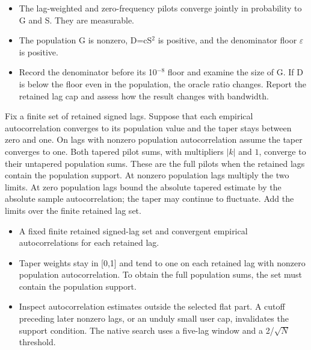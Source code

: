 \expandafter\def\csname statadic@assumptions@STATADIC-BLOCKLENGTH-003\endcsname{\begin{itemize}
\item The lag-weighted and zero-frequency pilots converge jointly in probability to G and S. They are measurable.
\item The population G is nonzero, D=cS\ensuremath{{}^2} is positive, and the denominator floor \ensuremath{\varepsilon} is positive.
\end{itemize}}
\expandafter\def\csname statadic@diagnostics@STATADIC-BLOCKLENGTH-003\endcsname{\begin{itemize}
\item Record the denominator before its 10\ensuremath{{}^{-8}} floor and examine the size of G. If D is below the floor even in the population, the oracle ratio changes. Report the retained lag cap and assess how the result changes with bandwidth.
\end{itemize}}
\expandafter\def\csname statadic@statement@STATADIC-BLOCKLENGTH-004\endcsname{Fix a finite set of retained signed lags. Suppose that
  each empirical autocorrelation converges to its population value and the
  taper stays between zero and one. On lags with nonzero population
  autocorrelation assume the taper converges to one. Both tapered pilot sums,
  with multipliers $|k|$ and $1$, converge to their untapered population
  sums. These are the full pilots when the retained lags contain the
  population support.}
\expandafter\def\csname statadic@proof@STATADIC-BLOCKLENGTH-004\endcsname{At nonzero population lags multiply the two limits.
  At zero population lags bound the absolute tapered estimate by the
  absolute sample autocorrelation; the taper may continue to fluctuate.
  Add the limits over the finite retained lag set.}
\expandafter\def\csname statadic@assumptions@STATADIC-BLOCKLENGTH-004\endcsname{\begin{itemize}
\item A fixed finite retained signed-lag set and convergent empirical autocorrelations for each retained lag.
\item Taper weights stay in [0,1] and tend to one on each retained lag with nonzero population autocorrelation. To obtain the full population sums, the set must contain the population support.
\end{itemize}}
\expandafter\def\csname statadic@diagnostics@STATADIC-BLOCKLENGTH-004\endcsname{\begin{itemize}
\item Inspect autocorrelation estimates outside the selected flat part. A cutoff preceding later nonzero lags, or an unduly small user cap, invalidates the support condition. The native search uses a five-lag window and a 2/\ensuremath{\sqrt{N}} threshold.
\end{itemize}}
